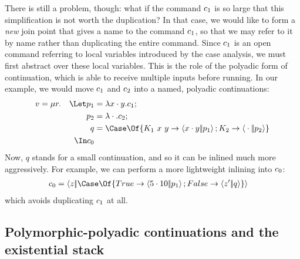 \documentclass{article}
\begin{document}
There is still a problem, though: what if the command $c_1$ is so large that
this simplification is not worth the duplication?  In that case, we would like
to form a \emph{new} join point that gives a name to the command $c_1$, so
that we may refer to it by name rather than duplicating the entire command.
Since $c_1$ is an open command referring to local variables introduced by the
case analysis, we must first abstract over these local variables.  This is the
role of the polyadic form of continuation, which is able to receive multiple
inputs before running.  In our example, we would move $c_1$ and $c_2$ into
a named, polyadic continuations:
\begin{gather*}
\begin{aligned}
  v
  &=
  \comp{r}
  &
    \Let
      p_1 &= \fnk{\pack{x}{y}} \cmd_1;
  \\
  &&
      p_2 &= \fnk{\packs{}{}} \cmd_2;
  \\
  &&
      q &= \Case\Of \{
          K_1 ~ x ~ y \to \cut{\pack{x}{y}}{p_1};
          K_2 \to \cut{\packs{}{}}{p_2}
          \}
  \\
  &&
    \In
    \cmd_0
\end{aligned}
\end{gather*}
Now, $q$ stands for a small continuation, and so it can be inlined much more
aggressively.  For example, we can perform a more lightweight inlining into
$c_0$:
\begin{align*}
  \cmd_0
  &=
  \cut{z}{\Case\Of \{ True \to \cut{\pack{5}{10}}{p_1}; False \to \cut{z'}{q} \}}
\end{align*}
which avoids duplicating $c_1$ at all.

\subsection{Polymorphic-polyadic continuations and the existential stack}
\end{document}
